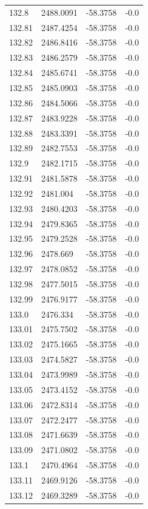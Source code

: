\begin{table}[H]
\begin{tabular}{llll}
132.8 & 2488.0091 & -58.3758 & -0.0 \\
132.81 & 2487.4254 & -58.3758 & -0.0 \\
132.82 & 2486.8416 & -58.3758 & -0.0 \\
132.83 & 2486.2579 & -58.3758 & -0.0 \\
132.84 & 2485.6741 & -58.3758 & -0.0 \\
132.85 & 2485.0903 & -58.3758 & -0.0 \\
132.86 & 2484.5066 & -58.3758 & -0.0 \\
132.87 & 2483.9228 & -58.3758 & -0.0 \\
132.88 & 2483.3391 & -58.3758 & -0.0 \\
132.89 & 2482.7553 & -58.3758 & -0.0 \\
132.9 & 2482.1715 & -58.3758 & -0.0 \\
132.91 & 2481.5878 & -58.3758 & -0.0 \\
132.92 & 2481.004 & -58.3758 & -0.0 \\
132.93 & 2480.4203 & -58.3758 & -0.0 \\
132.94 & 2479.8365 & -58.3758 & -0.0 \\
132.95 & 2479.2528 & -58.3758 & -0.0 \\
132.96 & 2478.669 & -58.3758 & -0.0 \\
132.97 & 2478.0852 & -58.3758 & -0.0 \\
132.98 & 2477.5015 & -58.3758 & -0.0 \\
132.99 & 2476.9177 & -58.3758 & -0.0 \\
133.0 & 2476.334 & -58.3758 & -0.0 \\
133.01 & 2475.7502 & -58.3758 & -0.0 \\
133.02 & 2475.1665 & -58.3758 & -0.0 \\
133.03 & 2474.5827 & -58.3758 & -0.0 \\
133.04 & 2473.9989 & -58.3758 & -0.0 \\
133.05 & 2473.4152 & -58.3758 & -0.0 \\
133.06 & 2472.8314 & -58.3758 & -0.0 \\
133.07 & 2472.2477 & -58.3758 & -0.0 \\
133.08 & 2471.6639 & -58.3758 & -0.0 \\
133.09 & 2471.0802 & -58.3758 & -0.0 \\
133.1 & 2470.4964 & -58.3758 & -0.0 \\
133.11 & 2469.9126 & -58.3758 & -0.0 \\
133.12 & 2469.3289 & -58.3758 & -0.0 \\

\end{tabular}
\end{table}
